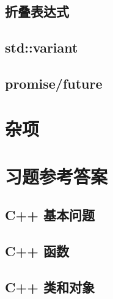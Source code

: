 \documentclass{article}
\begin{document}
	\subsection{折叠表达式}
	\subsection{std::variant}
	
	
	\subsection{promise/future}
	

	
	\section{杂项}
	
	\section{习题参考答案}
	\subsection{C++ 基本问题}
	
	
	
	\subsection{C++ 函数}
	
	
	\subsection{C++ 类和对象}
	
	
	
\label{unknown}
\end{document}
